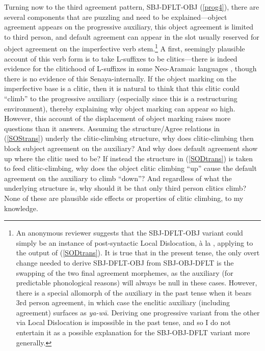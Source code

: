 \documentclass[output=paper
,modfonts
,nonflat]{langsci/langscibook}
\begin{document}
Turning now to the third agreement pattern, SBJ-DFLT-OBJ (\ref{prog4}), there are several components that are puzzling and need to be explained---object agreement appears on the progressive auxiliary, this object agreement is limited to third person, and default agreement can appear in the slot usually reserved for object agreement on the imperfective verb stem.\footnote{An anonymous reviewer suggests that the SBJ-DFLT-OBJ variant could simply be an instance of post-syntactic Local Dislocation, \`a la \citet{EmbickNoyer01}, applying to the output of (\ref{SODtrans}). It is true that in the present tense, the only overt change needed to derive SBJ-DFLT-OBJ from SBJ-OBJ-DFLT is the swapping of the two final agreement morphemes, as the auxiliary (for predictable phonological reasons) will always be null in these cases. However, there is a special allomorph of the auxiliary in the past tense when it bears 3rd person agreement, in which case the enclitic auxiliary (including agreement) surfaces as \textit{ya-w\=a}. Deriving one progressive variant from the other via Local Dislocation is impossible in the past tense, and so I do not entertain it as a possible explanation for the SBJ-OBJ-DFLT variant more generally.} A first, seemingly  plausible account of this verb form is to take L-suffixes to be clitics---there is indeed evidence for the clitichood of L-suffixes in some Neo-Aramaic languages \citep{DoronKhan12}, though there is no evidence of this Senaya-internally. If the object marking on the imperfective base is a clitic, then it is natural to think that this clitic could ``climb'' to the progressive auxiliary (especially since this is a restructuring environment), thereby explaining why object marking can appear so high. However, this account of the displacement of object marking raises more questions than it answers. Assuming the structure/Agree relations in (\ref{SOStrans}) underly the clitic-climbing structure, why does clitic-climbing then block subject agreement on the auxiliary? And why does default agreement show up where the clitic used to be? If instead the structure in (\ref{SODtrans}) is taken to feed clitic-climbing, why does the object clitic climbing ``up'' cause the default agreement on the auxiliary to climb ``down''? And regardless of what the underlying structure is, why should it be that only third person clitics climb? None of these are plausible side effects or properties of clitic climbing, to my knowledge.
\end{document}
